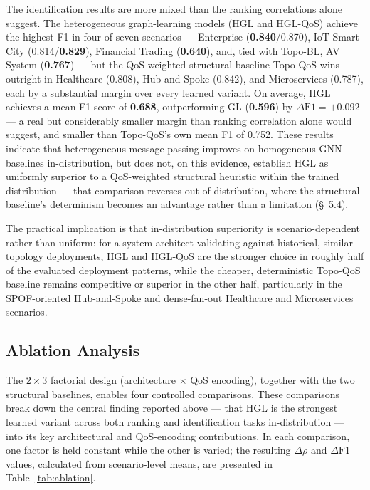 \documentclass[review]{elsarticle}
\begin{document}
The identification results are more mixed than the ranking correlations alone suggest. The
heterogeneous graph-learning models (HGL and HGL-QoS) achieve the highest F1 in four of seven
scenarios --- Enterprise (\textbf{0.840}/0.870), IoT Smart City (0.814/\textbf{0.829}), Financial
Trading (\textbf{0.640}), and, tied with Topo-BL, AV System (\textbf{0.767}) --- but the
QoS-weighted structural baseline Topo-QoS wins outright in Healthcare (0.808), Hub-and-Spoke
(0.842), and Microservices (0.787), each by a substantial margin over every learned variant. On
average, HGL achieves a mean F1 score of \textbf{0.688}, outperforming GL (\textbf{0.596}) by
$\Delta\text{F1} = +0.092$ --- a real but considerably smaller margin than ranking correlation
alone would suggest, and smaller than Topo-QoS's own mean F1 of 0.752. These results indicate that
heterogeneous message passing improves on homogeneous GNN baselines in-distribution, but does not,
on this evidence, establish HGL as uniformly superior to a QoS-weighted structural heuristic within
the trained distribution --- that comparison reverses out-of-distribution, where the structural
baseline's determinism becomes an advantage rather than a limitation (\S~5.4).

The practical implication is that in-distribution superiority is scenario-dependent rather than
uniform: for a system architect validating against historical, similar-topology deployments, HGL
and HGL-QoS are the stronger choice in roughly half of the evaluated deployment patterns, while the
cheaper, deterministic Topo-QoS baseline remains competitive or superior in the other half,
particularly in the SPOF-oriented Hub-and-Spoke and dense-fan-out Healthcare and Microservices
scenarios.

\subsection{Ablation Analysis}

The $2\times3$ factorial design (architecture $\times$ QoS encoding), together with the two
structural baselines, enables four controlled comparisons. These comparisons break down the
central finding reported above --- that HGL is the strongest learned variant across both ranking
and identification tasks in-distribution --- into its key architectural and QoS-encoding
contributions. In each comparison, one factor is held constant while the other is varied; the
resulting $\Delta\rho$ and $\Delta\text{F1}$ values, calculated from scenario-level means, are
presented in Table~\ref{tab:ablation}.
\end{document}
